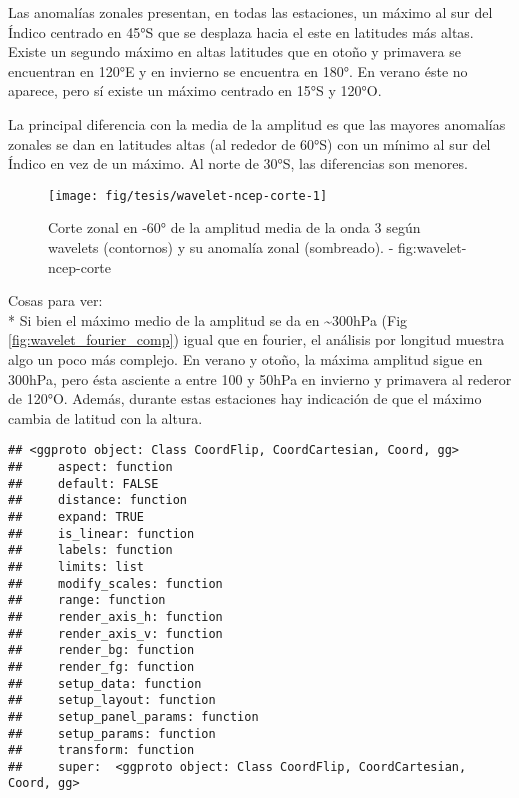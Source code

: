 \documentclass[spanish,a4paper]{book}
\begin{document}
Las anomalías zonales presentan, en todas las estaciones, un máximo al
sur del Índico centrado en 45°S que se desplaza hacia el este en
latitudes más altas. Existe un segundo máximo en altas latitudes que en
otoño y primavera se encuentran en 120°E y en invierno se encuentra en
180°. En verano éste no aparece, pero sí existe un máximo centrado en
15°S y 120°O.

La principal diferencia con la media de la amplitud es que las mayores
anomalías zonales se dan en latitudes altas (al rededor de 60°S) con un
mínimo al sur del Índico en vez de un máximo. Al norte de 30°S, las
diferencias son menores.


\begin{figure}

{\centering \texttt{[image: fig/tesis/wavelet-ncep-corte-1]} 

}

\caption{Corte zonal en -60° de la amplitud media de la onda 3 según wavelets (contornos) y su anomalía zonal (sombreado). - fig:wavelet-ncep-corte}\label{fig:wavelet-ncep-corte}
\end{figure}

Cosas para ver:\\
* Si bien el máximo medio de la amplitud se da en
\textasciitilde{}300hPa (Fig \autoref{fig:wavelet_fourier_comp}) igual
que en fourier, el análisis por longitud muestra algo un poco más
complejo. En verano y otoño, la máxima amplitud sigue en 300hPa, pero
ésta asciente a entre 100 y 50hPa en invierno y primavera al rederor de
120°O. Además, durante estas estaciones hay indicación de que el máximo
cambia de latitud con la altura.

\begin{verbatim}
## <ggproto object: Class CoordFlip, CoordCartesian, Coord, gg>
##     aspect: function
##     default: FALSE
##     distance: function
##     expand: TRUE
##     is_linear: function
##     labels: function
##     limits: list
##     modify_scales: function
##     range: function
##     render_axis_h: function
##     render_axis_v: function
##     render_bg: function
##     render_fg: function
##     setup_data: function
##     setup_layout: function
##     setup_panel_params: function
##     setup_params: function
##     transform: function
##     super:  <ggproto object: Class CoordFlip, CoordCartesian, Coord, gg>
\end{verbatim}
\end{document}
